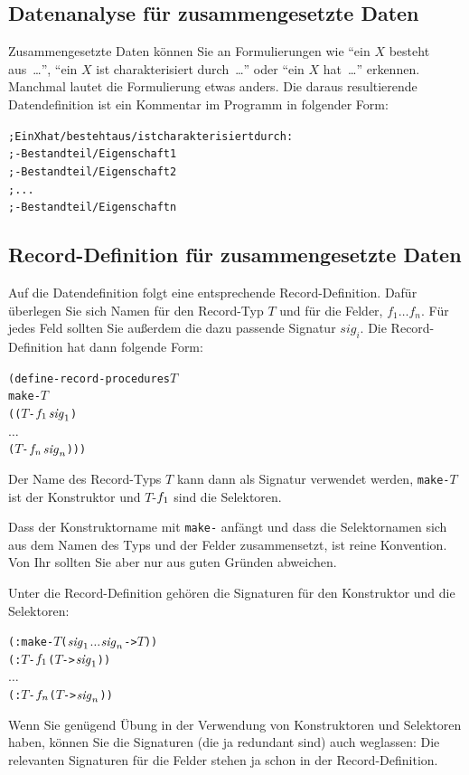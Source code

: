 \subsection{Datenanalyse für zusammengesetzte Daten}

Zusammengesetzte Daten können Sie an Formulierungen wie "`ein $X$
besteht aus~\ldots"', "`ein $X$ ist charakterisiert durch~\ldots"'
oder "`ein $X$ hat~\ldots"' erkennen.  Manchmal lautet die
Formulierung etwas anders.  Die daraus resultierende Datendefinition
ist ein Kommentar im Programm in folgender Form:
%
\begin{alltt}
; Ein X hat / besteht aus / ist charakterisiert durch:
; - Bestandteil / Eigenschaft 1
; - Bestandteil / Eigenschaft 2
; ...
; - Bestandteil / Eigenschaft n
\end{alltt}

\subsection{Record-Definition für zusammengesetzte Daten}

Auf die Datendefinition folgt eine entsprechende Record-Definition.
Dafür überlegen Sie sich Namen für den Record-Typ $T$ und für die
Felder, $f_1 \ldots f_n$.  Für jedes Feld sollten Sie außerdem
die dazu passende Signatur $\mathit{sig}_{i}$.
Die Record-Definition hat dann folgende
Form:
%
\begin{alltt}
(define-record-procedures \(T\)
  make-\(T\)
  ((\(T\)-\(f\sb{1}\) \(\mathit{sig}\sb{1}\))
   \(\ldots\)
   (\(T\)-\(f\sb{n}\) \(\mathit{sig}\sb{n}\))))
\end{alltt}
%
Der Name des Record-Typs \(T\) kann dann als Signatur verwendet
werden, \texttt{make-\(T\)} ist der Konstruktor und \(T\)-\(f\sb{1}\)
sind die Selektoren.

Dass der Konstruktorname mit \texttt{make-} anfängt und dass die
Selektornamen sich aus dem Namen des Typs und der Felder
zusammensetzt, ist reine Konvention.  Von Ihr sollten Sie aber nur aus
guten Gründen abweichen.

Unter die Record-Definition gehören die Signaturen für den Konstruktor
und die Selektoren:
%
\begin{alltt}
(: make-\(T\) (\(\mathit{sig}\sb{1}\) \(\ldots\) \(\mathit{sig}\sb{n}\) -> \(T\)))
(: \(T\)-\(f\sb{1}\) (\(T\) -> \(\mathit{sig}\sb{1}\)))
\(\ldots\)
(: \(T\)-\(f\sb{n}\) (\(T\) -> \(\mathit{sig}\sb{n}\)))
\end{alltt}
%
Wenn Sie genügend Übung in der Verwendung von Konstruktoren und
Selektoren haben, können Sie die Signaturen (die ja redundant sind)
auch weglassen: Die relevanten Signaturen für die Felder stehen ja
schon in der Record-Definition.

